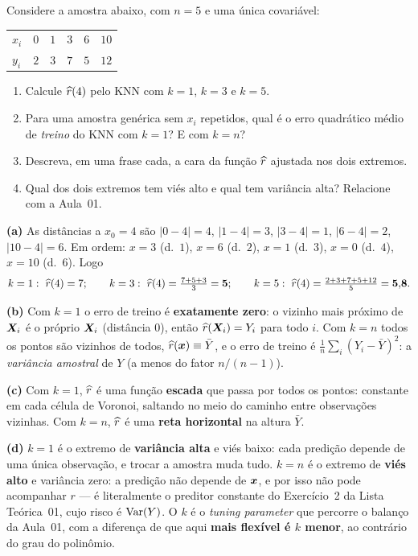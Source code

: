 \documentclass[11pt,a4paper]{article}
\begin{document}

\begin{exercicio}
Considere a amostra abaixo, com $n=5$ e uma única covariável:
\begin{center}\small
\begin{tabular}{@{}lrrrrr@{}}
\toprule
$x_i$ & $0$ & $1$ & $3$ & $6$ & $10$ \\
$y_i$ & $2$ & $3$ & $7$ & $5$ & $12$ \\
\bottomrule
\end{tabular}
\end{center}
\begin{enumerate}[label=(\alph*),leftmargin=1.1cm]
  \item Calcule $\widehat{r}(4)$ pelo KNN com $k=1$, $k=3$ e $k=5$.
  \item Para uma amostra genérica sem $x_i$ repetidos, qual é o erro quadrático
        médio de \emph{treino} do KNN com $k=1$? E com $k=n$?
  \item Descreva, em uma frase cada, a cara da função $\widehat{r}$ ajustada nos dois
        extremos.
  \item Qual dos dois extremos tem viés alto e qual tem variância alta? Relacione
        com a Aula~01.
\end{enumerate}
\end{exercicio}

\begin{solucao}
\textbf{(a)} As distâncias a $x_0=4$ são $|0-4|=4$, $|1-4|=3$, $|3-4|=1$,
$|6-4|=2$, $|10-4|=6$. Em ordem: $x=3$ (d.\ $1$), $x=6$ (d.\ $2$), $x=1$ (d.\ $3$),
$x=0$ (d.\ $4$), $x=10$ (d.\ $6$). Logo
\[
  k=1:\ \widehat{r}(4)=7; \qquad
  k=3:\ \widehat{r}(4)=\tfrac{7+5+3}{3}=\mathbf{5}; \qquad
  k=5:\ \widehat{r}(4)=\tfrac{2+3+7+5+12}{5}=\mathbf{5{,}8}.
\]

\smallskip
\textbf{(b)} Com $k=1$ o erro de treino é \textbf{exatamente zero}: o vizinho mais
próximo de $\bm{X}_i$ é o próprio $\bm{X}_i$ (distância $0$), então
$\widehat{r}(\bm{X}_i)=Y_i$ para todo $i$. Com $k=n$ todos os pontos são vizinhos de todos,
$\widehat{r}(\bm{x})\equiv\bar Y$, e o erro de treino é
$\frac1n\sum_i(Y_i-\bar Y)^2$: a \emph{variância amostral} de $Y$ (a menos do
fator $n/(n-1)$).

\smallskip
\textbf{(c)} Com $k=1$, $\widehat{r}$ é uma função \textbf{escada} que passa por todos
os pontos: constante em cada célula de Voronoi, saltando no meio do caminho entre
observações vizinhas. Com $k=n$, $\widehat{r}$ é uma \textbf{reta horizontal} na altura
$\bar Y$.

\smallskip
\textbf{(d)} $k=1$ é o extremo de \textbf{variância alta} e viés baixo: cada
predição depende de uma única observação, e trocar a amostra muda tudo. $k=n$ é o
extremo de \textbf{viés alto} e variância zero: a predição não depende de $\bm{x}$, e
por isso não pode acompanhar $r$ --- é literalmente o preditor constante do
Exercício~2 da Lista Teórica~01, cujo risco é $\operatorname{Var}(Y)$. O $k$ é o
\emph{tuning parameter} que percorre o balanço da Aula~01, com a diferença de que
aqui \textbf{mais flexível é $k$ menor}, ao contrário do grau do polinômio.
\end{solucao}
\end{document}
